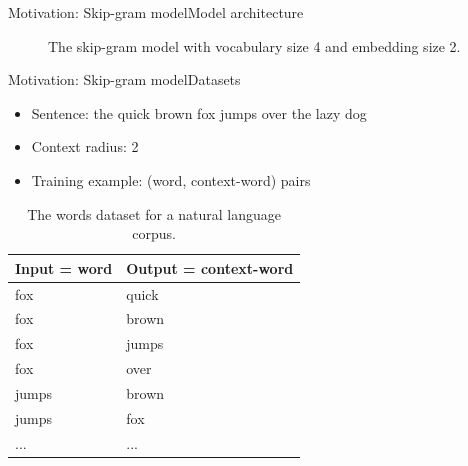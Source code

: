 \documentclass{beamer}
\begin{document}
\begin{frame}{Motivation: Skip-gram model}{Model architecture}
\begin{figure}[H]
		\caption{The skip-gram model with vocabulary size 4 and embedding size 2.}
		\label{fig:skipGram}
	\end{figure}
\end{frame}

\begin{frame}{Motivation: Skip-gram model}{Datasets}
	\begin{itemize}
		\item Sentence: the quick brown fox jumps over the lazy dog
		\item Context radius: 2
		\item Training example: (word, context-word) pairs
	\end{itemize}
	\begin{table}[!ht]
		\centering
		\caption{The words dataset for a natural language corpus.}
		\begin{tabularx}{0.8\textwidth}{|X|X|}  \hline
			Input = word & Output = context-word \\ \hline
			fox & quick \\ \hline
			fox & brown \\ \hline
			fox & jumps \\ \hline
			fox & over \\ \hline
			jumps & brown \\ \hline
			jumps & fox \\ \hline
			... & ...       \\ \hline
		\end{tabularx}
		\label{tab:words}
	\end{table}
\end{frame}
\end{document}
